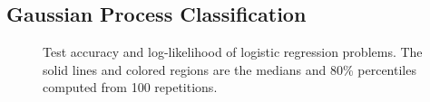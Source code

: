 \subsection{Gaussian Process Classification}\label{section:bgp}
\begin{figure}
  \vspace{-0.1in}
  \centering
  \caption{Test accuracy and log-likelihood of logistic regression problems.
    The solid lines and colored regions are the medians and 80\% percentiles computed from 100 repetitions.
  }\label{fig:logistic}
  \vspace{-0.2in}
\end{figure}

